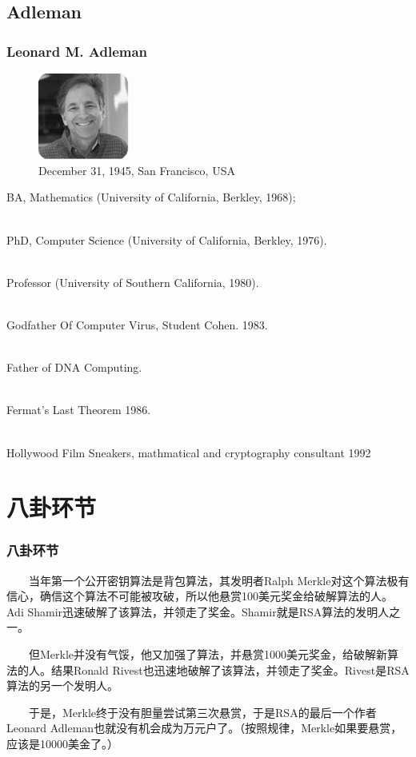 \documentclass[slidestop,compress,mathserif]{beamer}
\begin{document}
\subsection{\hfill Adleman}
\begin{frame}
  \frametitle{Leonard M. Adleman}
  \begin{multicols}{2}
    \begin{figure}
      \includegraphics[width=3cm]{a.png}
      \caption{December 31, 1945, San Francisco, USA}
    \end{figure}

    BA, Mathematics (University of California, Berkley, 1968);

    ~\\

    PhD, Computer Science (University of California, Berkley, 1976).

    ~\\

    Professor (University of Southern California, 1980).

    ~\\

    Godfather Of Computer Virus, Student Cohen. 1983.

    ~\\

    Father of DNA Computing. 

    ~\\

    Fermat's Last Theorem 1986.

    ~\\ 
    Hollywood Film Sneakers, mathmatical and cryptography consultant 1992 
    
  \end{multicols}

\end{frame}

\section{八卦环节}
\begin{frame}
  \transblindsvertical
  \frametitle{八卦环节}
 ~~~~当年第一个公开密钥算法是背包算法，其发明者Ralph Merkle对这个算法极有信心，确信这个算法不可能被攻破，所以他悬赏100美元奖金给破解算法的人。Adi Shamir迅速破解了该算法，并领走了奖金。Shamir就是RSA算法的发明人之一。

 ~~~~但Merkle并没有气馁，他又加强了算法，并悬赏1000美元奖金，给破解新算法的人。结果Ronald Rivest也迅速地破解了该算法，并领走了奖金。Rivest是RSA算法的另一个发明人。

 ~~~~于是，Merkle终于没有胆量尝试第三次悬赏，于是RSA的最后一个作者Leonard Adleman也就没有机会成为万元户了。（按照规律，Merkle如果要悬赏，应该是10000美金了。）
\end{frame}
\end{document}
